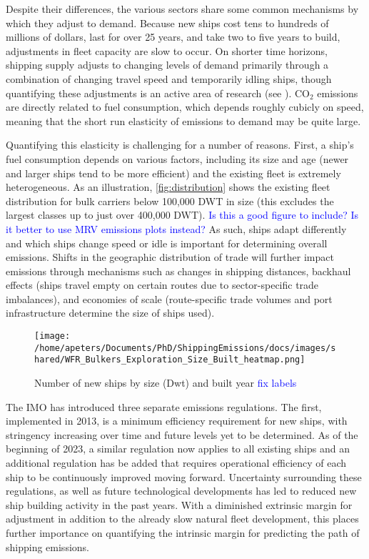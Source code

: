 \documentclass[hidelinks, 12pt,letterpaper]{article}
\begin{document}
Despite their differences, the various sectors share some common mechanisms by which they adjust to demand. Because new ships cost tens to hundreds of millions of dollars, last for over 25 years, and take two to five years to build, adjustments in fleet capacity are slow to occur. On shorter time horizons, shipping supply adjusts to changing levels of demand primarily through a combination of changing travel speed and temporarily idling ships, though quantifying these adjustments is an active area of research (see \citet*{adland2018dynamic, ollila2022effect,assmann2015missing}). CO$_2$ emissions are directly related to fuel consumption, which depends roughly cubicly on speed, meaning that the short run elasticity of emissions to demand may be quite large. 

Quantifying this elasticity is challenging for a number of reasons. First, a ship's fuel consumption depends on various factors, including its size and age (newer and larger ships tend to be more efficient) and the existing fleet is extremely heterogeneous. As an illustration, \autoref{fig:distribution} shows the existing fleet distribution for bulk carriers below 100,000 DWT in size (this excludes the largest classes up to just over 400,000 DWT). 
\textcolor{blue}{Is this a good figure to include? Is it better to use MRV emissions plots instead?} 
As such, ships adapt differently and which ships change speed or idle is important for determining overall emissions.
Shifts in the geographic distribution of trade will further impact emissions through mechanisms such as changes in shipping distances, backhaul effects (ships travel empty on certain routes due to sector-specific trade imbalances), and economies of scale (route-specific trade volumes and port infrastructure determine the size of ships used).


\begin{figure}[h]
  \centering
  \texttt{[image: /home/apeters/Documents/PhD/ShippingEmissions/docs/images/shared/WFR\_Bulkers\_Exploration\_Size\_Built\_heatmap.png]}
  \caption{Number of new ships by size (Dwt) and built year \textcolor{blue}{fix labels}
}
  \label{fig:distribution}
\end{figure}

The IMO has introduced three separate emissions regulations. The first, implemented in 2013, is a minimum efficiency requirement for new ships, with stringency increasing over time and future levels yet to be determined. As of the beginning of 2023, a similar regulation now applies to all existing ships and an additional regulation has be added that requires operational efficiency of each ship to be continuously improved moving forward. Uncertainty surrounding these regulations, as well as future technological developments has led to reduced new ship building activity in the past years. With a diminished extrinsic margin for adjustment in addition to the already slow natural fleet development, this places further importance on quantifying the intrinsic margin for predicting the path of shipping emissions. 
\end{document}
